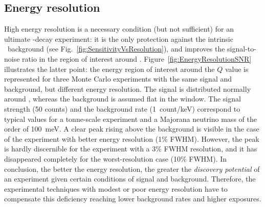 \documentclass{PoS}
\begin{document}
\subsection{Energy resolution} \label{subsec:EnergyResolution}
High energy resolution is a necessary condition (but not sufficient) for an ultimate \bbonu-decay experiment: it is the only protection against the intrinsic \bbtnu\ background (see Fig.~\ref{fig:SensitivityVsResolution}), and improves the signal-to-noise ratio in the region of interest around \Qbb. Figure~\ref{fig:EnergyResolutionSNR} illustrates the latter point: the energy region of interest around the $Q$ value is represented for three Monte Carlo experiments with the same signal and background, but different energy resolution. The signal is distributed normally around \Qbb, whereas the background is assumed flat in the window. The signal strength (50 counts) and the background rate (1~count/keV) correspond to typical values for a tonne-scale experiment and a Majorana neutrino mass of the order of 100~meV. A clear peak rising above the background is visible in the case of the experiment with better energy resolution (1\% FWHM). However, the peak is hardly discernible for the experiment with a 3\% FWHM resolution, and it has disappeared completely for the worst-resolution case (10\% FWHM). In conclusion, the better the energy resolution, the greater the \emph{discovery potential} of an experiment given certain conditions of signal and background. Therefore, the experimental techniques with modest or poor energy resolution have to compensate this deficiency reaching lower background rates and higher exposures.
\end{document}
